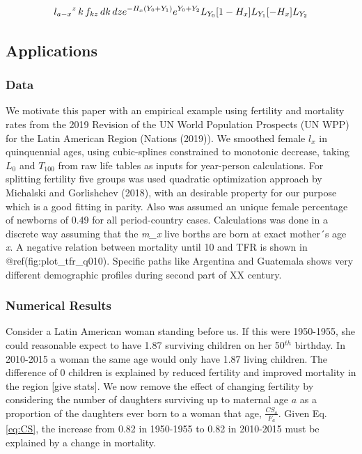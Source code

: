\documentclass[
]{article}
\begin{document}
\[{l_{a-x}}^z \, k\, f_{kz} \,dk\,dz\\
e^{-H_x(Y_0 + Y_1)}e^{Y_0 + Y_2}\\
L_{Y_0}[1-H_x]L_{Y_1}[-H_x]L_{Y_2}\]

\hypertarget{Applications}{%
\subsection{Applications}\label{Applications}}

\hypertarget{Data}{%
\subsubsection{Data}\label{Data}}

We motivate this paper with an empirical example using fertility and
mortality rates from the 2019 Revision of the UN World Population
Prospects (UN WPP) for the Latin American Region (Nations (2019)). We
smoothed female \(l_x\) in quinquennial ages, using cubic-splines
constrained to monotonic decrease, taking \(L_0\) and \(T_{100}\) from
raw life tables as inputs for year-person calculations. For splitting
fertility five groups was used quadratic optimization approach by
Michalski and Gorlishchev (2018), with an desirable property for our
purpose which is a good fitting in parity. Also was assumed an unique
female percentage of newborns of 0.49 for all period-country cases.
Calculations was done in a discrete way assuming that the \emph{m\_x}
live borths are born at exact mother´s age \emph{x}. A negative relation
between mortality until 10 and TFR is shown in
@ref(fig:plot\_tfr\_q010). Specific paths like Argentina and Guatemala
shows very different demographic profiles during second part of XX
century.

\hypertarget{numerical-results}{%
\subsubsection{Numerical Results}\label{numerical-results}}

Consider a Latin American woman standing before us. If this were
1950-1955, she could reasonable expect to have 1.87 surviving children
on her 50\(^{th}\) birthday. In 2010-2015 a woman the same age would
only have 1.87 living children. The difference of 0 children is
explained by reduced fertility and improved mortality in the region
{[}give stats{]}. We now remove the effect of changing fertility by
considering the number of daughters surviving up to maternal age \(a\)
as a proportion of the daughters ever born to a woman that age,
\(\frac{CS_a}{F_a}\). Given Eq. \ref{eq:CS}, the increase from 0.82 in
1950-1955 to 0.82 in 2010-2015 must be explained by a change in
mortality.
\end{document}

